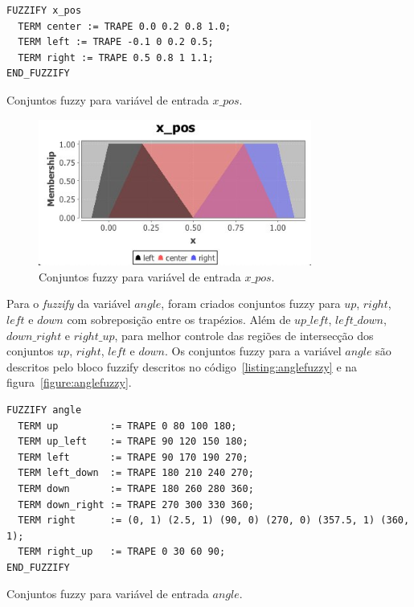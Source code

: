 \documentclass[12pt, a4paper]{article}
\begin{document}
\begin{listing}[h!]
  \begin{verbatim}
FUZZIFY x_pos
  TERM center := TRAPE 0.0 0.2 0.8 1.0;
  TERM left := TRAPE -0.1 0 0.2 0.5;
  TERM right := TRAPE 0.5 0.8 1 1.1;
END_FUZZIFY
\end{verbatim}
  \caption{Conjuntos fuzzy para variável de entrada $x\_pos$.}\label{listing:xposfuzzy}
\end{listing}

\begin{figure}[h!]
  \centering
  \includegraphics[width=0.8\textwidth]{assets/x_pos.jpg}
  \caption{Conjuntos fuzzy para variável de entrada $x\_pos$.}\label{figure:xposfuzzy}
\end{figure}

Para o \textit{fuzzify} da variável $angle$, foram criados conjuntos fuzzy para $up$, $right$, $left$ e $down$ com sobreposição entre os trapézios.
Além de $up\_left$, $left\_down$, $down\_right$ e $right\_up$, para melhor controle das regiões de intersecção dos conjuntos $up$, $right$, $left$ e $down$.
Os conjuntos fuzzy para a variável $angle$ são descritos pelo bloco fuzzify descritos no código~\ref{listing:anglefuzzy} e na figura~\ref{figure:anglefuzzy}.

\begin{listing}[h!]
  \begin{verbatim}
FUZZIFY angle
  TERM up         := TRAPE 0 80 100 180;
  TERM up_left    := TRAPE 90 120 150 180;
  TERM left       := TRAPE 90 170 190 270;
  TERM left_down  := TRAPE 180 210 240 270;
  TERM down       := TRAPE 180 260 280 360;
  TERM down_right := TRAPE 270 300 330 360;
  TERM right      := (0, 1) (2.5, 1) (90, 0) (270, 0) (357.5, 1) (360, 1);
  TERM right_up   := TRAPE 0 30 60 90;
END_FUZZIFY
  \end{verbatim}
  \caption{Conjuntos fuzzy para variável de entrada $angle$.}\label{listing:anglefuzzy}
\end{listing}
\end{document}
